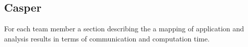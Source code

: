 \documentclass[final]{article}
\begin{document}
\subsection{Casper}
For each team member a section describing the a mapping of application and analysis results in terms of communication and computation time.
\end{document}
